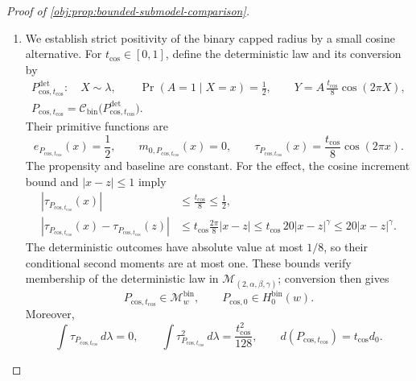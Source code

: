 \documentclass[11pt]{article}
\begin{document}
\begin{proof}[Proof of \cref{obj:prop:bounded-submodel-comparison}]
\begin{enumerate}
\item We establish strict positivity of the binary capped radius by a small cosine alternative. For \(t_{\mathrm{cos}}\in[0,1]\), define the deterministic law and its conversion by
\[
\begin{gathered}
P^{\mathrm{det}}_{\mathrm{cos},t_{\mathrm{cos}}}:
\quad X\sim\lambda,\qquad
\Pr(A=1\mid X=x)=\frac12,\qquad
Y=A\,\frac{t_{\mathrm{cos}}}{8}\cos(2\pi X),\\
P_{\mathrm{cos},t_{\mathrm{cos}}}
=\mathcal C_{\mathrm{bin}}
 \bigl(P^{\mathrm{det}}_{\mathrm{cos},t_{\mathrm{cos}}}\bigr).
\end{gathered}
\]
Their primitive functions are
\[
e_{P_{\mathrm{cos},t_{\mathrm{cos}}}}(x)=\frac12,\qquad
m_{0,P_{\mathrm{cos},t_{\mathrm{cos}}}}(x)=0,\qquad
\tau_{P_{\mathrm{cos},t_{\mathrm{cos}}}}(x)
=\frac{t_{\mathrm{cos}}}{8}\cos(2\pi x).
\]
The propensity and baseline are constant. For the effect, the cosine increment bound and \(|x-z|\le1\) imply
\[
\begin{split}
|\tau_{P_{\mathrm{cos},t_{\mathrm{cos}}}}(x)|
&\le\frac{t_{\mathrm{cos}}}{8}\le\frac12,\\
|\tau_{P_{\mathrm{cos},t_{\mathrm{cos}}}}(x)
 -\tau_{P_{\mathrm{cos},t_{\mathrm{cos}}}}(z)|
&\le t_{\mathrm{cos}}\frac{2\pi}{8}|x-z|
 \le t_{\mathrm{cos}}\,20|x-z|^\gamma
 \le20|x-z|^\gamma.
\end{split}
\]
The deterministic outcomes have absolute value at most \(1/8\), so their conditional second moments are at most one. These bounds verify membership of the deterministic law in
\(\mathcal M_{(2,\alpha,\beta,\gamma)}\); conversion then gives
\[
P_{\mathrm{cos},t_{\mathrm{cos}}}\in\mathcal M_w^{\mathrm{bin}},
\qquad
P_{\mathrm{cos},0}\in H_0^{\mathrm{bin}}(w).
\]
Moreover,
\[
\int\tau_{P_{\mathrm{cos},t_{\mathrm{cos}}}}\,d\lambda=0,\qquad
\int\tau_{P_{\mathrm{cos},t_{\mathrm{cos}}}}^2\,d\lambda
=\frac{t_{\mathrm{cos}}^2}{128},
\qquad
d(P_{\mathrm{cos},t_{\mathrm{cos}}})=t_{\mathrm{cos}}d_0.
\]


\end{enumerate}
\end{proof}
\end{document}
